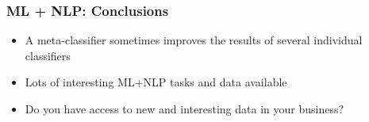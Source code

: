 \begin{frame}[fragile]\frametitle{ML + NLP: Conclusions}
  \begin{itemize}
      \item A meta-classifier sometimes improves the results of several individual classifiers

    \item Lots of interesting ML+NLP tasks and data available
	
    \item Do you have access to new and interesting data in your business?
          \end{itemize}
\end{frame}





